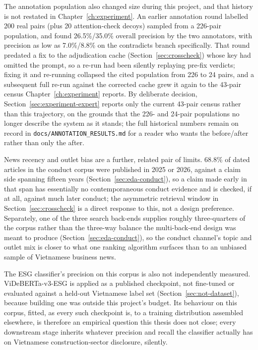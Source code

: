 \documentclass[fontsize=12pt,oneside,headings=small]{scrreprt}
\begin{document}
The annotation population also changed size during this project, and that history is not restated in Chapter~\ref{ch:experiment}. An earlier annotation round labelled 200 real pairs (plus 20 attention-check decoys) sampled from a 226-pair population, and found 26.5\%/35.0\% overall precision by the two annotators, with precision as low as 7.0\%/8.8\% on the \textsf{contradicts} branch specifically. That round predated a fix to the adjudication cache (Section~\ref{sec:crosscheck}) whose key had omitted the prompt, so a re-run had been silently replaying pre-fix verdicts; fixing it and re-running collapsed the cited population from 226 to 24 pairs, and a subsequent full re-run against the corrected cache grew it again to the 43-pair census Chapter~\ref{ch:experiment} reports. By deliberate decision, Section~\ref{sec:experiment-expert} reports only the current 43-pair census rather than this trajectory, on the grounds that the 226- and 24-pair populations no longer describe the system as it stands; the full historical numbers remain on record in \texttt{docs/ANNOTATION\_RESULTS.md} for a reader who wants the before/after rather than only the after.

News recency and outlet bias are a further, related pair of limits. 68.8\% of dated articles in the conduct corpus were published in 2025 or 2026, against a claim side spanning fifteen years (Section~\ref{sec:eda-conduct}), so a claim made early in that span has essentially no contemporaneous conduct evidence and is checked, if at all, against much later conduct; the asymmetric retrieval window in Section~\ref{sec:crosscheck} is a direct response to this, not a design preference. Separately, one of the three search back-ends supplies roughly three-quarters of the corpus rather than the three-way balance the multi-back-end design was meant to produce (Section~\ref{sec:eda-conduct}), so the conduct channel's topic and outlet mix is closer to what one ranking algorithm surfaces than to an unbiased sample of Vietnamese business news.

The ESG classifier's precision on this corpus is also not independently measured. ViDeBERTa-v3-ESG is applied as a published checkpoint, not fine-tuned or evaluated against a held-out Vietnamese label set (Section~\ref{sec:not-dataset}), because building one was outside this project's budget. Its behaviour on this corpus, fitted, as every such checkpoint is, to a training distribution assembled elsewhere, is therefore an empirical question this thesis does not close; every downstream stage inherits whatever precision and recall the classifier actually has on Vietnamese construction-sector disclosure, silently.
\end{document}
